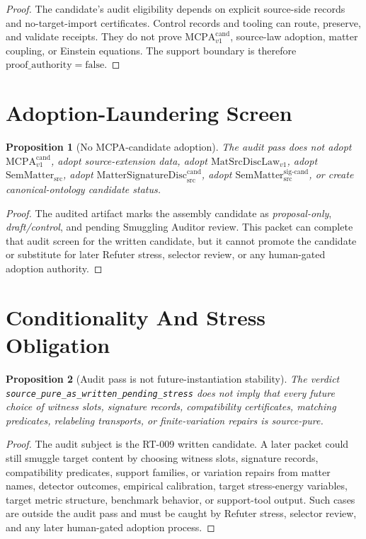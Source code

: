 \documentclass[11pt]{article}
\newcommand{\MatSrcDiscLaw}{\mathrm{MatSrcDiscLaw}_{v1}}
\newcommand{\SemMatterSrc}{\mathrm{SemMatter}_{\mathrm{src}}}
\newcommand{\SemMatterSig}{\mathrm{SemMatter}_{\mathrm{src}}^{\mathrm{sig\text{-}cand}}}
\newcommand{\MatSigDisc}{\mathrm{MatterSignatureDisc}_{\mathrm{src}}^{\mathrm{cand}}}
\newcommand{\MCPACand}{\mathrm{MCPA}^{\mathrm{cand}}_{v1}}
\newcommand{\ProofAuthFalse}{\mathrm{proof\_authority=false}}
\newtheorem{proposition}{Proposition}
\begin{document}
\begin{proof}
The candidate's audit eligibility depends on explicit source-side records and
no-target-import certificates. Control records and tooling can route,
preserve, and validate receipts. They do not prove \(\MCPACand\), source-law
adoption, matter coupling, or Einstein equations. The support boundary is
therefore \(\ProofAuthFalse\).
\end{proof}

\section{Adoption-Laundering Screen}

\begin{proposition}[No MCPA-candidate adoption]
The audit pass does not adopt \(\MCPACand\), adopt source-extension data,
adopt \(\MatSrcDiscLaw\), adopt \(\SemMatterSrc\), adopt \(\MatSigDisc\),
adopt \(\SemMatterSig\), or create canonical-ontology candidate status.
\end{proposition}

\begin{proof}
The audited artifact marks the assembly candidate as \emph{proposal-only},
\emph{draft/control}, and pending Smuggling Auditor review. This packet can
complete that audit screen for the written candidate, but it cannot promote
the candidate or substitute for later Refuter stress, selector review, or any
human-gated adoption authority.
\end{proof}

\section{Conditionality And Stress Obligation}

\begin{proposition}[Audit pass is not future-instantiation stability]
The verdict \texttt{source\_pure\_as\_written\_pending\_stress} does not imply
that every future choice of witness slots, signature records, compatibility
certificates, matching predicates, relabeling transports, or finite-variation
repairs is source-pure.
\end{proposition}

\begin{proof}
The audit subject is the RT-009 written candidate. A later packet could still
smuggle target content by choosing witness slots, signature records,
compatibility predicates, support families, or variation repairs from matter
names, detector outcomes, empirical calibration, target stress-energy
variables, target metric structure, benchmark behavior, or support-tool
output. Such cases are outside the audit pass and must be caught by Refuter
stress, selector review, and any later human-gated adoption process.
\end{proof}
\end{document}
